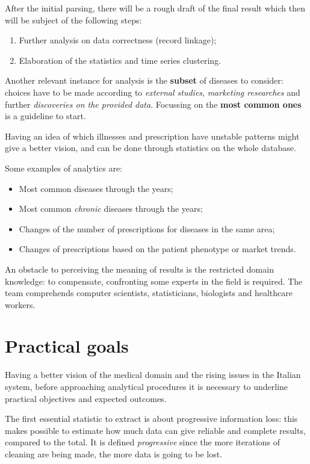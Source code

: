 After the initial parsing, there will be a rough draft of the final result which then will be subject of the following steps:
\begin{enumerate}
	\item Further analysis on data correctness (record linkage);
	\item Elaboration of the statistics and time series clustering.
\end{enumerate}

Another relevant instance for analysis is the \textbf{subset} of diseases to consider: choices have to be made according to \textit{external studies}, \textit{marketing researches} and further \textit{discoveries on the provided data}. Focussing on the \textbf{most common ones} is a guideline to start.

Having an idea of which illnesses and prescription have unstable patterns might give a better vision, and can be done through statistics on the whole database. 

Some examples of analytics are:
\begin{itemize}
	\item Most common diseases through the years;
	\item Most common \textit{chronic} diseases through the years;
	\item Changes of the number of prescriptions for diseases in the same area;
	\item Changes of prescriptions based on the patient phenotype or market trends.
\end{itemize}

An obstacle to perceiving the meaning of results is the restricted domain knowledge: to compensate, confronting some experts in the field is required. The team comprehends computer scientists, statisticians, biologists and healthcare workers.

\section{Practical goals}
Having a better vision of the medical domain and the rising issues in the Italian system, before approaching analytical procedures it is necessary to underline practical objectives and expected outcomes.

The first essential statistic to extract is about progressive information loss: this makes possible to estimate how much data can give reliable and complete results, compared to the total. It is defined \textit{progressive} since the more iterations of cleaning are being made, the more data is going to be lost. 


